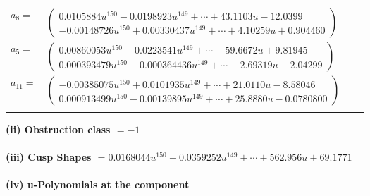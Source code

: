\documentclass[1p]{elsarticle_modified}
\theoremstyle{definition}
\begin{document}
\begin{tabular}{m{7pt} m{180pt} m{7pt} m{180pt} }
\flushright $a_{8}=$&$\begin{pmatrix}0.0105884 u^{150}-0.0198923 u^{149}+\cdots+43.1103 u-12.0399\\-0.00148726 u^{150}+0.00330437 u^{149}+\cdots+4.10259 u+0.904460\end{pmatrix}$ \\
\flushright $a_{5}=$&$\begin{pmatrix}0.00860053 u^{150}-0.0223541 u^{149}+\cdots-59.6672 u+9.81945\\0.000393479 u^{150}-0.000364436 u^{149}+\cdots-2.69319 u-2.04299\end{pmatrix}$ \\
\flushright $a_{11}=$&$\begin{pmatrix}-0.00385075 u^{150}+0.0101935 u^{149}+\cdots+21.0110 u-8.58046\\0.000913499 u^{150}-0.00139895 u^{149}+\cdots+25.8880 u-0.0780800\end{pmatrix}$\\&\end{tabular}
\flushleft \textbf{(ii) Obstruction class $= -1$}\\~\\
\flushleft \textbf{(iii) Cusp Shapes $= 0.0168044 u^{150}-0.0359252 u^{149}+\cdots+562.956 u+69.1771$}\\~\\
\newpage\renewcommand{\arraystretch}{1}
\flushleft \textbf{(iv) u-Polynomials at the component}\newline \\
\end{document}
